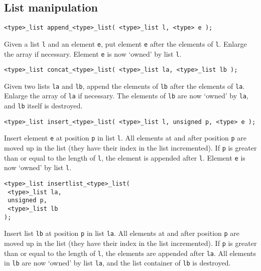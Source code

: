 \subsection{List manipulation}
\begin{verbatim}
<type>_list append_<type>_list( <type>_list l, <type> e );
\end{verbatim}
\begin{desc}
Given a list {\tt l} and an element {\tt e},
put element {\tt e} after the elements of {\tt l}.
Enlarge the array if necessary.
Element {\tt e} is now `owned' by list {\tt l}.
\end{desc}
\begin{verbatim}
<type>_list concat_<type>_list( <type>_list la, <type>_list lb );
\end{verbatim}
\begin{desc}
Given two lists {\tt la} and {\tt lb},
append the elements of {\tt lb} after the elements of {\tt la}.
Enlarge the array of {\tt la} if necessary.
The elements of {\tt lb} are now `owned' by {\tt la},
and {\tt lb} itself is destroyed.
\end{desc}
\begin{verbatim}
<type>_list insert_<type>_list( <type>_list l, unsigned p, <type> e );
\end{verbatim}
\begin{desc}
Insert element {\tt e} at position {\tt p} in list {\tt l}.
All elements at and after position {\tt p} are moved up in the list
(they have their index in the list incremented).
If {\tt p} is greater than or equal to the length of {\tt l},
the element is appended after {\tt l}.
Element {\tt e} is now `owned' by list {\tt l}.
\end{desc}
\begin{verbatim}
<type>_list insertlist_<type>_list(
 <type>_list la,
 unsigned p,
 <type>_list lb
);
\end{verbatim}
\begin{desc}
Insert list {\tt lb} at position {\tt p} in list {\tt la}.
All elements at and after position {\tt p} are moved up in the list
(they have their index in the list incremented).
If {\tt p} is greater than or equal to the length of {\tt l},
the elements are appended after {\tt la}.
All elements in {\tt lb} are now `owned' by list {\tt la}, and the
list container of {\tt lb} is destroyed.
\end{desc}

